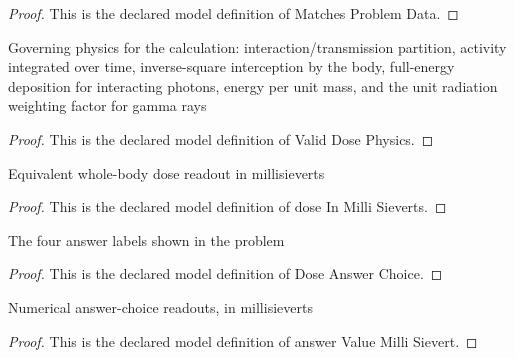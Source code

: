 \begin{proof}
  This is the declared model definition of Matches Problem Data.
\end{proof}
\begin{definition}
  \label{def:physics:phyx-mini-0619:phyxmini0619-validdosephysics}
  Governing physics for the calculation: interaction/transmission partition, activity integrated over time, inverse-square interception by the body, full-energy deposition for interacting photons, energy per unit mass, and the unit radiation weighting factor for gamma rays
\end{definition}
\begin{proof}
  This is the declared model definition of Valid Dose Physics.
\end{proof}
\begin{definition}
  \label{def:physics:phyx-mini-0619:phyxmini0619-doseinmillisieverts}
  Equivalent whole-body dose readout in millisieverts
\end{definition}
\begin{proof}
  This is the declared model definition of dose In Milli Sieverts.
\end{proof}
\begin{definition}
  \label{def:physics:phyx-mini-0619:phyxmini0619-doseanswerchoice}
  The four answer labels shown in the problem
\end{definition}
\begin{proof}
  This is the declared model definition of Dose Answer Choice.
\end{proof}
\begin{definition}
  \label{def:physics:phyx-mini-0619:phyxmini0619-answervaluemillisievert}
  Numerical answer-choice readouts, in millisieverts
\end{definition}
\begin{proof}
  This is the declared model definition of answer Value Milli Sievert.
\end{proof}
